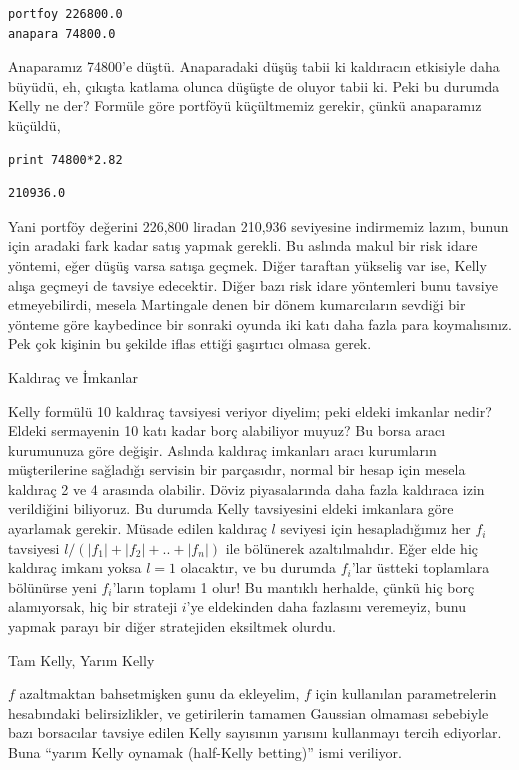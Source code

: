 \documentclass[12pt,fleqn]{article}\usepackage{../../common}
\begin{document}
\begin{verbatim}
portfoy 226800.0
anapara 74800.0
\end{verbatim}

Anaparamız 74800'e düştü. Anaparadaki düşüş tabii ki kaldıracın etkisiyle daha
büyüdü, eh, çıkışta katlama olunca düşüşte de oluyor tabii ki. Peki bu durumda
Kelly ne der? Formüle göre portföyü küçültmemiz gerekir, çünkü anaparamız
küçüldü,

\begin{verbatim}
print 74800*2.82
\end{verbatim}

\begin{verbatim}
210936.0
\end{verbatim}

Yani portföy değerini 226,800 liradan 210,936 seviyesine indirmemiz lazım,
bunun için aradaki fark kadar satış yapmak gerekli. Bu aslında makul bir
risk idare yöntemi, eğer düşüş varsa satışa geçmek. Diğer taraftan yükseliş
var ise, Kelly alışa geçmeyi de tavsiye edecektir. Diğer bazı risk idare
yöntemleri bunu tavsiye etmeyebilirdi, mesela Martingale denen bir dönem
kumarcıların sevdiği bir yönteme göre kaybedince bir sonraki oyunda iki
katı daha fazla para koymalısınız. Pek çok kişinin bu şekilde iflas ettiği
şaşırtıcı olmasa gerek. 

Kaldıraç ve İmkanlar

Kelly formülü 10 kaldıraç tavsiyesi veriyor diyelim; peki eldeki imkanlar
nedir? Eldeki sermayenin 10 katı kadar borç alabiliyor muyuz? Bu borsa
aracı kurumunuza göre değişir. Aslında kaldıraç imkanları aracı kurumların
müşterilerine sağladığı servisin bir parçasıdır, normal bir hesap için
mesela kaldıraç 2 ve 4 arasında olabilir. Döviz piyasalarında daha fazla
kaldıraca izin verildiğini biliyoruz. Bu durumda Kelly tavsiyesini eldeki
imkanlara göre ayarlamak gerekir. Müsade edilen kaldıraç $l$ seviyesi için
hesapladığımız her $f_i$ tavsiyesi $l / (|f_1| + |f_2| + .. + |f_n|)$ ile
bölünerek azaltılmalıdır. Eğer elde hiç kaldıraç imkanı yoksa $l=1$
olacaktır, ve bu durumda $f_i$'lar üstteki toplamlara bölünürse yeni
$f_i$'ların toplamı 1 olur! Bu mantıklı herhalde, çünkü hiç borç
alamıyorsak, hiç bir strateji $i$'ye eldekinden daha fazlasını veremeyiz,
bunu yapmak parayı bir diğer stratejiden eksiltmek olurdu. 

Tam Kelly, Yarım Kelly

$f$ azaltmaktan bahsetmişken şunu da ekleyelim, $f$ için kullanılan
parametrelerin hesabındaki belirsizlikler, ve getirilerin tamamen Gaussian
olmaması sebebiyle bazı borsacılar tavsiye edilen Kelly sayısının yarısını
kullanmayı tercih ediyorlar. Buna ``yarım Kelly oynamak (half-Kelly
betting)'' ismi veriliyor. 
\end{document}
